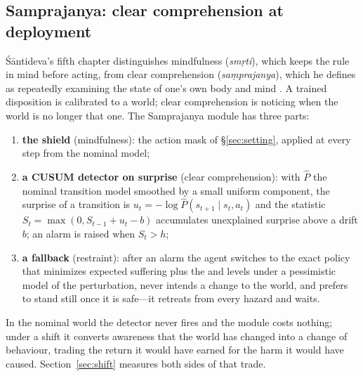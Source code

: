 \subsection{Samprajanya: clear comprehension at deployment}
\label{sec:samprajanya}
Śāntideva's fifth chapter distinguishes mindfulness (\emph{smṛti}), which keeps the rule in mind before acting, from clear comprehension (\emph{saṃprajanya}), which he defines as repeatedly examining the state of one's own body and mind \cite{santideva1995}.
A trained disposition is calibrated to a world; clear comprehension is noticing when the world is no longer that one.
The Samprajanya module has three parts:
\begin{enumerate}
\item \textbf{the shield} (mindfulness): the action mask of \S\ref{sec:setting}, applied at every step from the nominal model;
\item \textbf{a CUSUM detector on surprise} (clear comprehension): with $\hat P$ the nominal transition model smoothed by a small uniform component, the surprise of a transition is $u_t=-\log\hat P(s_{t+1}\mid s_t,a_t)$ and the statistic $S_t=\max(0,S_{t-1}+u_t-b)$ \cite{page1954cusum} accumulates unexplained surprise above a drift $b$; an alarm is raised when $S_t>h$;
\item \textbf{a fallback} (restraint): after an alarm the agent switches to the exact policy that minimizes expected suffering plus the \Karma{} and \Anatta{} levels under a pessimistic model of the perturbation, never intends a change to the world, and prefers to stand still once it is safe---it retreats from every hazard and waits.
\end{enumerate}
In the nominal world the detector never fires and the module costs nothing; under a shift it converts awareness that the world has changed into a change of behaviour, trading the return it would have earned for the harm it would have caused.
Section~\ref{sec:shift} measures both sides of that trade.
